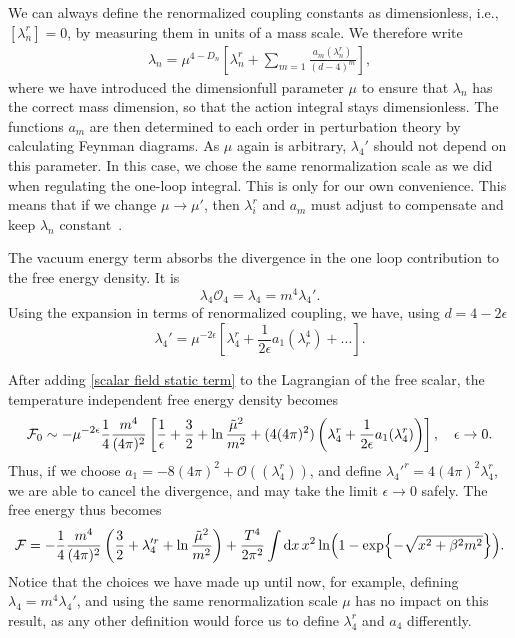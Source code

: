 We can always define the renormalized coupling constants as dimensionless, i.e., $[\lambda_n^r] = 0$, by measuring them in units of a mass scale.
We therefore write 
\begin{align*}
    \lambda_n = \mu^{4 - D_n}
    \left[
        \lambda_n^r + \sum_{m=1} \frac{a_m(\lambda_n^r)}{(d - 4)^{m}}
    \right],
\end{align*}
where we have introduced the dimensionfull parameter $\mu$ to ensure that $\lambda_n$ has the correct mass dimension, so that the action integral stays dimensionless.
The functions $a_m$ are then determined to each order in perturbation theory by calculating Feynman diagrams.
As $\mu$ again is arbitrary, $\lambda_4'$ should not depend on this parameter.
In this case, we chose the same renormalization scale as we did when regulating the one-loop integral.
This is only for our own convenience.
This means that if we change $\mu \rightarrow \mu'$, then $\lambda_i^r$ and $a_m$ must adjust to compensate and keep $\lambda_n$ constant~\cite{t_hoft_dim_reg}.

The vacuum energy term absorbs the divergence in the one loop contribution to the free energy density.
It is
\begin{equation}
    \label{scalar field static term}
    \lambda_4 \mathcal{O}_4 = \lambda_4 = m^4 \lambda_4'.
\end{equation}
Using the expansion in terms of renormalized coupling, we have, using $d = 4 - 2\epsilon$
\begin{equation}
    \lambda_4' = \mu^{- 2 \epsilon}\left[ \lambda_4^r + \frac{1}{2 \epsilon} a_1(\lambda_r^4) + ... \right].
\end{equation}

After adding \cref{scalar field static term} to the Lagrangian of the free scalar, the temperature independent free energy density becomes
\begin{equation}
    \mathcal{F}_0 \sim - \mu^{-2 \epsilon}  \frac{1}{4} \frac{m^4}{(4 \pi)^2}  
    \left[
        \frac{1}{\epsilon} + \frac{3}{2} + \ln{\frac{\tilde \mu^2}{m^2}}
        + (4 (4 \pi)^2) \left(\lambda_4^r + \frac{1}{2\epsilon} a_1(\lambda_4^r)\right)
    \right],
    \quad \epsilon \rightarrow 0.
\end{equation}
Thus, if we choose $a_1 = -8 (4\pi)^2 + \mathcal{O}((\lambda_4^r))$, and define $\lambda_4'^r = 4(4\pi)^2\lambda_4^r$, we are able to cancel the divergence, and may take the limit $\epsilon \rightarrow 0$ safely.
The free energy thus becomes
\begin{equation}
    \mathcal{F} = -\frac{1}{4} \frac{m^4}{(4 \pi)^2} 
    \left(
        \frac{3}{2} + \lambda_4'^r + \ln \frac{\tilde \mu^2}{m^2}
    \right)
    +
    \frac{T^4}{2\pi^2} \int \dd x \, x^2 \ln(1 - \exp{-\sqrt{x^2 + \beta^2 m^2}}).
\end{equation}
Notice that the choices we have made up until now, for example, defining $\lambda_4 = m^4 \lambda_4'$, and using the same renormalization scale $\mu$ has no impact on this result, as any other definition would force us to define $\lambda_4^r$ and $a_4$ differently.

